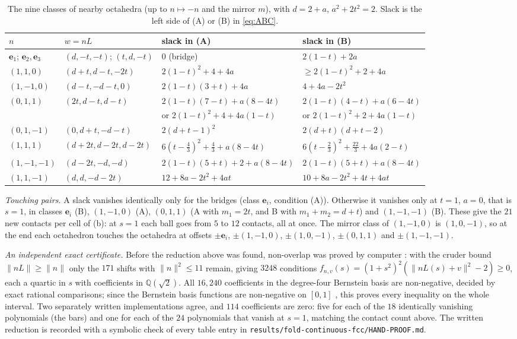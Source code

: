\documentclass[11pt]{amsart}
\theoremstyle{definition}
\theoremstyle{remark}
\newcommand{\Q}{\mathbb{Q}}
\newcommand{\e}{\mathbf{e}}
\newcommand{\norm}[1]{\lVert#1\rVert}
\begin{document}
\begin{table}[t]
\caption{The nine classes of nearby octahedra (up to $n\mapsto-n$ and the mirror $m$), with $d=2+a$, $a^2+2t^2=2$. Slack is the left side of (A) or (B) in \eqref{eq:ABC}.}
\label{tab:classes}
\small
\begin{tabular}{@{}llll@{}}
\toprule
$n$ & $w=nL$ & slack in (A) & slack in (B)\\
\midrule
$\e_1$; $\e_2,\e_3$ & $(d,-t,-t)$; $(t,d,-t)$ & $0$ (bridge) & $2(1-t)+2a$\\
$(1,1,0)$ & $(d+t,d-t,-2t)$ & $2(1-t)^2+4+4a$ & $\ge2(1-t)^2+2+4a$\\
$(1,-1,0)$ & $(d-t,-d-t,0)$ & $2(1-t)(3+t)+4a$ & $4+4a-2t^2$\\
$(0,1,1)$ & $(2t,d-t,d-t)$ & $2(1-t)(7-t)+a(8-4t)$ & $2(1-t)(4-t)+a(6-4t)$\\
 & & or $2(1-t)^2+4+4a(1-t)$ & or $2(1-t)^2+2+4a(1-t)$\\
$(0,1,-1)$ & $(0,d+t,-d-t)$ & $2(d+t-1)^2$ & $2(d+t)(d+t-2)$\\
$(1,1,1)$ & $(d+2t,d-2t,d-2t)$ & $6(t-\tfrac43)^2+\tfrac43+a(8-4t)$ & $6(t-\tfrac23)^2+\tfrac{22}3+4a(2-t)$\\
$(1,-1,-1)$ & $(d-2t,-d,-d)$ & $2(1-t)(5+t)+2+a(8-4t)$ & $2(1-t)(5+t)+a(8-4t)$\\
$(1,1,-1)$ & $(d,d,-d-2t)$ & $12+8a-2t^2+4at$ & $10+8a-2t^2+4t+4at$\\
\bottomrule
\end{tabular}
\end{table}

\emph{Touching pairs.} A slack vanishes identically only for the bridges (class $\e_i$, condition (A)). Otherwise it vanishes only at $t=1$, $a=0$, that is $s=1$, in classes $\e_i$ (B), $(1,-1,0)$ (A), $(0,1,1)$ (A with $m_1=2t$, and B with $m_1+m_2=d+t$) and $(1,-1,-1)$ (B). These give the $21$ new contacts per cell of (b): at $s=1$ each ball goes from $5$ to $12$ contacts, all at once. The mirror class of $(1,-1,0)$ is $(1,0,-1)$, so at the end each octahedron touches the octahedra at offsets $\pm\e_i$, $\pm(1,-1,0)$, $\pm(1,0,-1)$, $\pm(0,1,1)$ and $\pm(1,-1,-1)$.

\emph{An independent exact certificate.} Before the reduction above was found, non-overlap was proved by computer \cite{RepoContinuous}: with the cruder bound $\norm{nL}\ge\norm n$ only the $171$ shifts with $\norm n^2\le11$ remain, giving $3248$ conditions $f_{n,v}(s)=(1+s^2)^2(\norm{nL(s)+v}^2-2)\ge0$, each a quartic in $s$ with coefficients in $\Q(\sqrt2)$. All $16{,}240$ coefficients in the degree-four Bernstein basis are non-negative, decided by exact rational comparisons; since the Bernstein basis functions are non-negative on $[0,1]$ \cite{Farouki2012}, this proves every inequality on the whole interval. Two separately written implementations agree, and $114$ coefficients are zero: five for each of the $18$ identically vanishing polynomials (the bars) and one for each of the $24$ polynomials that vanish at $s=1$, matching the contact count above. The written reduction is recorded with a symbolic check of every table entry in \texttt{results/fold-continuous-fcc/HAND-PROOF.md}.
\end{document}
